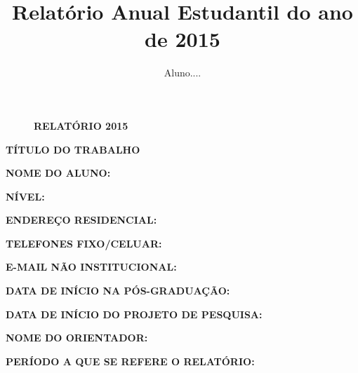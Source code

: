 \documentclass[12pt,a4paper,final]{report}%
\author{Aluno....}%
\title{Relatório Anual Estudantil do ano de 2015}
\begin{document}
\thispagestyle{empty}%


\begin{figure}[H]
\hspace{1cm}
\textbf{RELATÓRIO 2015}
\hspace{0.5cm}
\end{figure}

\begin{center}

\hspace{60cm}%

\hspace{60cm}

\textbf{TÍTULO DO TRABALHO} 
\end{center}

\hspace{60cm}

\hspace{60cm}

\begin{flushleft}

\textbf{NOME DO ALUNO:} 

\textbf{NÍVEL:} 

\textbf{ENDEREÇO RESIDENCIAL:} 

\textbf{TELEFONES FIXO/CELUAR:} 

\textbf{E-MAIL N\~AO INSTITUCIONAL:} 

\textbf{DATA DE INÍCIO NA PÓS-GRADUAÇ\~AO:} 

\textbf{DATA DE INÍCIO DO PROJETO DE PESQUISA:} 

\textbf{NOME DO ORIENTADOR:} 

\textbf{PERÍODO A QUE SE REFERE O RELATÓRIO:} 


\end{flushleft}
\end{document}
